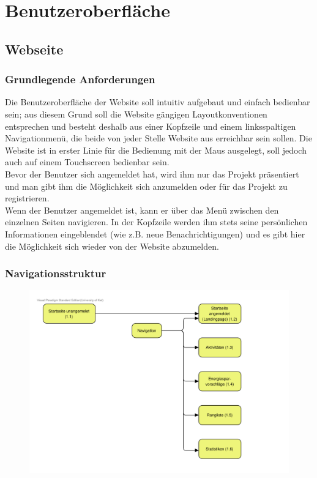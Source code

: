 \documentclass[10pt,a4paper]{article}
\begin{document}




\section{Benutzeroberfl\"ache}
\subsection{Webseite}
\subsubsection{Grundlegende Anforderungen}
Die Benutzeroberfläche der Website soll intuitiv aufgebaut und einfach bedienbar sein; aus diesem Grund soll die Website gängigen Layoutkonventionen entsprechen und besteht deshalb aus einer Kopfzeile und einem linksspaltigen Navigationmenü, die beide von jeder Stelle Website aus erreichbar sein sollen. Die Website ist in erster Linie für die Bedienung mit der Maus ausgelegt, soll jedoch auch auf einem Touchscreen bedienbar sein.\\
Bevor der Benutzer sich angemeldet hat, wird ihm nur das Projekt präsentiert und man gibt ihm die Möglichkeit sich anzumelden oder für das Projekt zu registrieren. \\
Wenn der Benutzer angemeldet ist, kann er über das Menü zwischen den einzelnen Seiten navigieren. In der Kopfzeile werden ihm stets seine persönlichen Informationen eingeblendet (wie z.B. neue Benachrichtigungen) und es gibt hier die Möglichkeit sich wieder von der Website abzumelden.
\subsubsection{Navigationsstruktur}
\begin{figure}[h!]
	\includegraphics[width=\linewidth]{gfx/guinavigation/GUI-Navigation-Website.pdf}
\end{figure}
\end{document}

